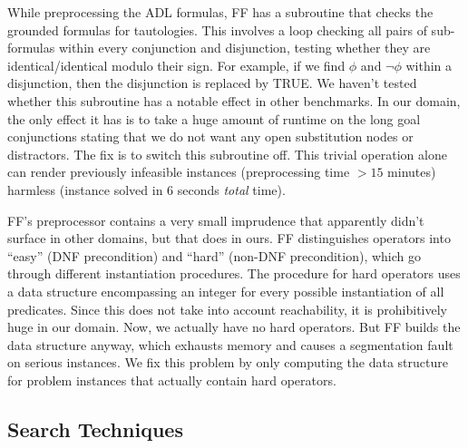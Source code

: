 While preprocessing the ADL formulas, FF has a subroutine that
checks the grounded formulas
for tautologies. This involves a loop checking all pairs of
sub-formulas within every conjunction and disjunction, testing whether
they are identical/identical modulo their sign. For example, if we
find $\phi$ and $\neg \phi$ within a disjunction, then the disjunction
is replaced by TRUE. We haven't tested whether this subroutine has a
notable effect in other benchmarks. In our domain, the only effect it
has is to take a huge amount of runtime on the long goal conjunctions
stating that we do not want any open substitution nodes or
distractors. The fix is to switch this subroutine off. This trivial
operation alone can render previously infeasible instances
(preprocessing time $>15$ minutes) harmless (instance solved in $6$
seconds {\em total} time).



FF's preprocessor contains a very small imprudence that apparently
didn't surface in other domains, but that does in ours. FF
distinguishes operators into ``easy'' (DNF precondition) and ``hard''
(non-DNF precondition), which go through different instantiation
procedures. The procedure for hard operators uses a data structure
encompassing an integer for every possible instantiation of all
predicates. Since this does not take into account reachability, it is
prohibitively huge in our domain. Now, we actually have no hard
operators. But FF builds the data structure anyway, which exhausts
memory and causes a segmentation fault on serious instances. We fix
this problem by only computing the data structure for problem
instances that actually contain hard operators.




















\subsection{Search Techniques}
\label{sec:crisp-ff:preprocess:heuristics}





